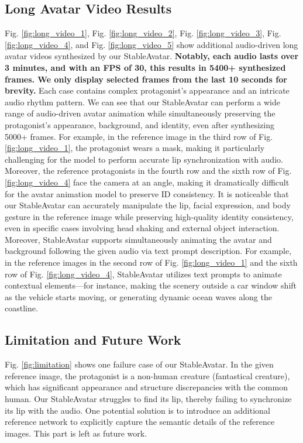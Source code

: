 \subsection{Long Avatar Video Results}
\label{supp:long_video}
Fig. \ref{fig:long_video_1}, Fig. \ref{fig:long_video_2}, Fig. \ref{fig:long_video_3}, Fig. \ref{fig:long_video_4}, and Fig. \ref{fig:long_video_5} show additional audio-driven long avatar videos synthesized by our StableAvatar.
\textbf{Notably, each audio lasts over 3 minutes, and with an FPS of 30, this results in 5400+ synthesized frames. We only display selected frames from the last 10 seconds for brevity.}
Each case contains complex protagonist's appearance and an intricate audio rhythm pattern.
We can see that our StableAvatar can perform a wide range of audio-driven avatar animation while simultaneously preserving the protagonist’s appearance, background, and identity, even after synthesizing 5000+ frames.
For example, in the reference image in the third row of Fig. \ref{fig:long_video_1}, the protagonist wears a mask, making it particularly challenging for the model to perform accurate lip synchronization with audio.
Moreover, the reference protagonists in the fourth row and the sixth row of Fig. \ref{fig:long_video_4} face the camera at an angle, making it dramatically difficult for the avatar animation model to preserve ID consistency. 
It is noticeable that our StableAvatar can accurately manipulate the lip, facial expression, and body gesture in the reference image while preserving high-quality identity consistency, even in specific cases involving head shaking and external object interaction.
Moreover, StableAvatar supports simultaneously animating the avatar and background following the given audio via text prompt description.
For example, in the reference images in the second row of Fig. \ref{fig:long_video_1} and the sixth row of Fig. \ref{fig:long_video_4}, StableAvatar utilizes text prompts to animate contextual elements—for instance, making the scenery outside a car window shift as the vehicle starts moving, or generating dynamic ocean waves along the coastline.

\subsection{Limitation and Future Work}
Fig. \ref{fig:limitation} shows one failure case of our StableAvatar. In the given reference image, the protagonist is a non-human creature (fantastical creature), which has significant appearance and structure discrepancies with the common human. Our StableAvatar struggles to find its lip, thereby failing to synchronize its lip with the audio.
One potential solution is to introduce an additional reference network to explicitly capture the semantic details of the reference images. This part is left as future work. 

